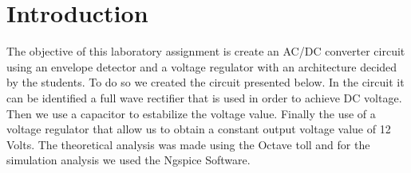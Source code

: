 \section{Introduction}
\label{sec:introduction}

The objective of this laboratory assignment is create an AC/DC converter circuit using an envelope detector and a voltage regulator with an architecture decided by the students. To do so we created the circuit presented below. In the circuit it can be identified a full wave rectifier that is used in order to achieve DC voltage. Then we use a capacitor to estabilize the voltage value. Finally the use of a voltage regulator that allow us to obtain a constant output voltage value of 12 Volts. The theoretical analysis was made using the Octave toll and for the simulation analysis we used the Ngspice Software.



